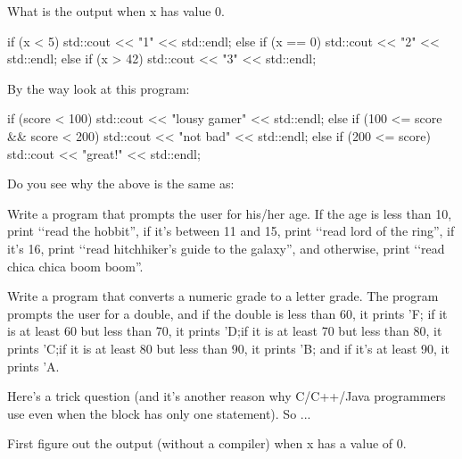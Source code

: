 \begin{ex}
What is the output when x has value 0.
\begin{console}
if (x < 5)
{
    std::cout << "1" << std::endl;
}
else
{
    if (x == 0)
    {
        std::cout << "2" << std::endl;
    }
    else
    {
        if (x > 42)
        {
            std::cout << "3" << std::endl;
        }
    }
}
\end{console}
\end{ex}
By the way look at this program:
\begin{console}
if (score < 100)
{
    std::cout << "lousy gamer" << std::endl;
}
else
{
    if (100 <= score && score < 200)
    {
        std::cout << "not bad" << std::endl;
    }
    else
    {
        if (200 <= score)
        {
            std::cout << "great!" << std::endl;
        }
     }
}
\end{console}
Do you see why the above is the same as:

\begin{ex}
Write a program that prompts the user for his/her
age. If the age is less than 10, print \lq\lq read the hobbit'', if
it's between 11 and 15, print \lq\lq read lord of the ring'',
if it's 16, print \lq\lq read hitchhiker's
guide to the galaxy'', and otherwise, print \lq\lq read chica chica boom
boom''.
\end{ex}
\begin{ex}
Write a program that converts a numeric grade to a
letter grade. The program prompts the user for a double, and if the
double is less than 60, it prints 'F; if
it is at least 60 but less than 70, it prints
'D;if it is at least 70 but less than
80, it prints 'C;if it is at least 80
but less than 90, it prints 'B; and if
it's at least 90, it prints
'A.
\end{ex}

\newpage{}

Here's a trick question (and it's another reason why C/C++/Java programmers use { } even when the block has only one statement). So ...
\begin{center}
\end{center}
First figure out the output (without a compiler) when x has a value of
0.

